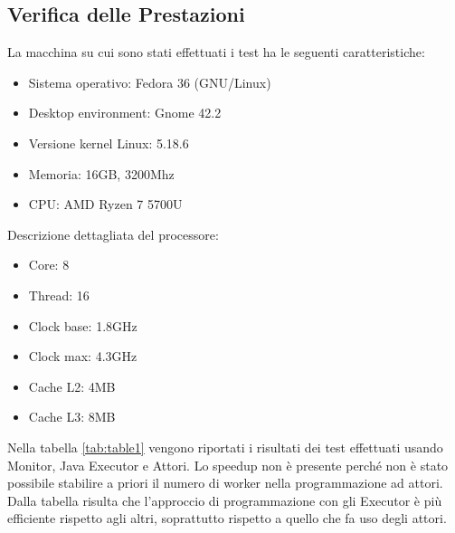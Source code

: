 \documentclass[12pt,a4paper,openright,twoside]{book}
\begin{document}
\subsection{Verifica delle Prestazioni}
La macchina su cui sono stati effettuati i test ha le seguenti caratteristiche:
\begin{itemize}
	\item Sistema operativo: Fedora 36 (GNU/Linux)
	\item Desktop environment: Gnome 42.2
	\item Versione kernel Linux: 5.18.6
	\item Memoria: 16GB, 3200Mhz
	\item CPU: AMD Ryzen 7 5700U
\end{itemize}
Descrizione dettagliata del processore:
\begin{itemize}
	\item Core: 8
	\item Thread: 16
	\item Clock base: 1.8GHz
	\item Clock max: 4.3GHz
	\item Cache L2: 4MB
	\item Cache L3: 8MB
\end{itemize}

Nella tabella \ref{tab:table1} vengono riportati i risultati dei test effettuati usando Monitor, Java Executor e Attori. Lo speedup non è presente perché non è stato possibile stabilire a priori il numero di worker nella programmazione ad attori.
Dalla tabella risulta che l'approccio di programmazione con gli Executor è più efficiente rispetto agli altri, soprattutto rispetto a quello che fa uso degli attori.
\end{document}
